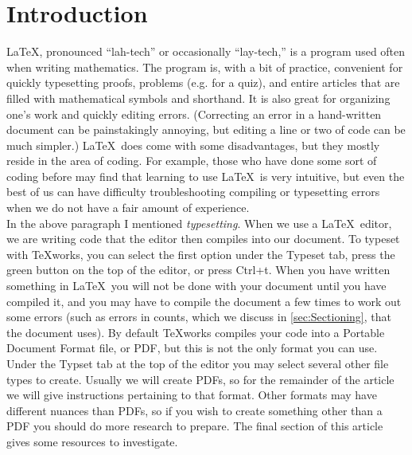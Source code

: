 \documentclass[10pt]{article}
\theoremstyle{Theorem}
\theoremstyle{definition}
\theoremstyle{custom}
\begin{document}
\section{Introduction} %
	\LaTeX, pronounced ``lah-tech'' or occasionally ``lay-tech,'' is a program used often when writing mathematics. The program is, with a bit of practice, convenient for quickly typesetting proofs, problems (e.g. for a quiz), and entire articles that are filled with mathematical symbols and shorthand. It is also great for organizing one's work and quickly editing errors. (Correcting an error in a hand-written document can be painstakingly annoying, but editing a line or two of code can be much simpler.) \LaTeX\ does come with some disadvantages, but they mostly reside in the area of coding. For example, those who have done some sort of coding before may find that learning to use \LaTeX\ is very intuitive, but even the best of us can have difficulty troubleshooting compiling or typesetting errors when we do not have a fair amount of experience.\\
	\indent In the above paragraph I mentioned \textit{typesetting}. When we use a \LaTeX\ editor, we are writing code that the editor then compiles into our document. To typeset with \TeX works, you can select the first option under the Typeset tab, press the green button on the top of the editor, or press Ctrl+t. When you have written something in \LaTeX\ you will not be done with your document until you have compiled it, and you may have to compile the document a few times to work out some errors (such as errors in counts, which we discuss in \ref{sec:Sectioning}, that the document uses). By default \TeX works compiles your code into a Portable Document Format file, or PDF, but this is not the only format you can use. Under the Typset tab at the top of the editor you may select several other file types to create. Usually we will create PDFs, so for the remainder of the article we will give instructions pertaining to that format. Other formats may have different nuances than PDFs, so if you wish to create something other than a PDF you should do more research to prepare. The final section of this article gives some resources to investigate.\\
\end{document}

